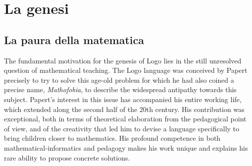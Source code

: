 \chapter{La genesi} \label{cap:papert}

\section{La paura della matematica}

The fundamental motivation for the genesis of Logo lies in the still unresolved question of mathematical teaching. The Logo language was conceived by Papert precisely to try to solve this age-old problem for which he had also coined a precise name, \textit{Mathofobia}, to describe the widespread antipathy towards this subject. Papert's interest in this issue has accompanied his entire working life, which  extended along the second half of the 20th century. His contribution was exceptional, both in terms of theoretical elaboration from the pedagogical point of view, and of the creativity that led him to devise a language specifically to bring children closer to mathematics. His profound competence in both mathematical-informatics and pedagogy makes his work unique and explains his rare ability to propose concrete solutions.

